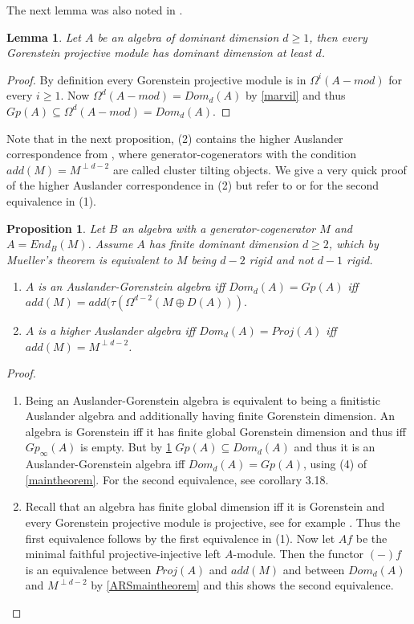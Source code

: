 \documentclass[a4paper]{amsart}
\newtheorem{lemma}[theorem]{Lemma}
\newtheorem{proposition}[theorem]{Proposition}
\theoremstyle{definition}
\theoremstyle{remark}
\numberwithin{equation}{theorem}
\begin{document}
The next lemma was also noted in \cite{Mar}.
\begin{lemma}\label{gpdomdim}
Let $A$ be an algebra of dominant dimension $d \geq 1$, then every Gorenstein projective module has dominant dimension at least $d$.
\end{lemma}
\begin{proof}
By definition every Gorenstein projective module is in $\Omega^{i}(A-mod)$ for every $i \geq 1$. Now $\Omega^{d}(A-mod)=Dom_d(A)$ by \ref{marvil} and thus $Gp(A) \subseteq \Omega^{d}(A-mod)=Dom_d(A)$.
\end{proof}

Note that in the next proposition, (2) contains the higher Auslander correspondence from \cite{Iya}, where generator-cogenerators with the condition $add(M)=M^{\perp d-2}$ are called cluster tilting objects. We give a very quick proof of the higher Auslander correspondence in (2) but refer to \cite{CheKoe} or \cite{IyaSol} for the second equivalence in (1).
\begin{proposition} \label{correspondences}
Let $B$ an algebra with a generator-cogenerator $M$ and $A=End_B(M)$. Assume $A$ has finite dominant dimension $d \geq 2$, which by Mueller's theorem is equivalent to $M$ being $d-2$ rigid and not $d-1$ rigid.
\begin{enumerate}
\item $A$ is an Auslander-Gorenstein algebra iff $Dom_d(A)=Gp(A)$ iff \newline $add(M)=add(\tau(\Omega^{d-2}(M \oplus D(A))).$
\item $A$ is a higher Auslander algebra iff $Dom_d(A)=Proj(A)$ iff $add(M)=M^{\perp d-2}$.


\end{enumerate}
\end{proposition}
\begin{proof}
\begin{enumerate}
\item Being an Auslander-Gorenstein algebra is equivalent to being a finitistic Auslander algebra and additionally having finite Gorenstein dimension. An algebra is Gorenstein iff it has finite global Gorenstein dimension and thus iff $Gp_{\infty}(A)$ is empty. But by \ref{gpdomdim} $Gp(A) \subseteq Dom_d(A)$ and thus it is an Auslander-Gorenstein algebra iff $Dom_d(A)=Gp(A)$, using (4) of \ref{maintheorem}. For the second equivalence, see \cite{CheKoe} corollary 3.18.
\item Recall that an algebra has finite global dimension iff it is Gorenstein and every Gorenstein projective module is projective, see for example \cite{Che}. Thus the first equivalence follows by the first equivalence in (1). Now let $Af$ be the minimal faithful projective-injective left $A$-module. Then the functor $(-)f$  is an equivalence between $Proj(A)$ and $add(M)$ and between $Dom_d(A)$ and $M^{\perp d-2}$ by \ref{ARSmaintheorem} and this shows the second equivalence. 
\end{enumerate}

\end{proof}
\end{document}
